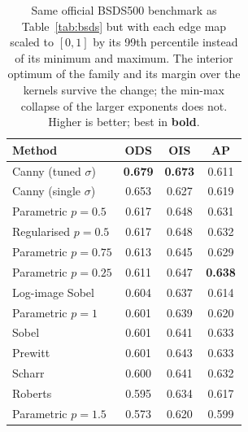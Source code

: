 \documentclass[conference]{IEEEtran}
\begin{document}
\begin{table}[!t]
\centering
\footnotesize
\caption{Same official BSDS500 benchmark as Table~\ref{tab:bsds} but with each
edge map scaled to $[0,1]$ by its 99th percentile instead of its minimum and
maximum.  The interior optimum of the family and its margin over the kernels
survive the change; the min-max collapse of the larger exponents does not.
Higher is better; best in \textbf{bold}.}
\label{tab:bsds_robust}
\begin{tabular}{@{}lccc@{}}
\toprule
Method & ODS & OIS & AP \\
\midrule
Canny (tuned $\sigma$)     & \textbf{0.679} & \textbf{0.673} & 0.611 \\
Canny (single $\sigma$)     & 0.653 & 0.627 & 0.619 \\
Parametric $p=0.5$           & 0.617 & 0.648 & 0.631 \\
Regularised $p=0.5$          & 0.617 & 0.648 & 0.632 \\
Parametric $p=0.75$          & 0.613 & 0.645 & 0.629 \\
Parametric $p=0.25$         & 0.611 & 0.647 & \textbf{0.638} \\
Log-image Sobel             & 0.604 & 0.637 & 0.614 \\
Parametric $p=1$             & 0.601 & 0.639 & 0.620 \\
Sobel                       & 0.601 & 0.641 & 0.633 \\
Prewitt                     & 0.601 & 0.643 & 0.633 \\
Scharr                      & 0.600 & 0.641 & 0.632 \\
Roberts                     & 0.595 & 0.634 & 0.617 \\
Parametric $p=1.5$           & 0.573 & 0.620 & 0.599 \\
\bottomrule
\end{tabular}
\end{table}
\end{document}
